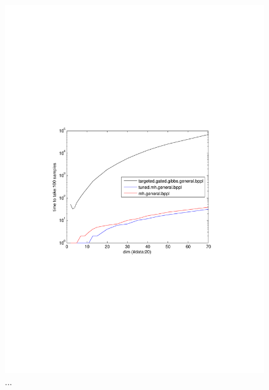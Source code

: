 \begin{figure}%
\centering
\includegraphics[width=1.2\textwidth]{pic1/dimAnaylysisDataFixed20.pdf}
\caption{...}
\label{fig:pref}
\end{figure}


